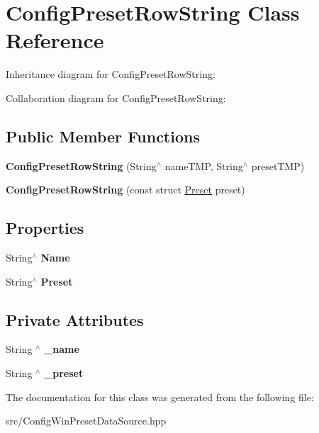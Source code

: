 \hypertarget{classConfigPresetRowString}{}\section{Config\+Preset\+Row\+String Class Reference}
\label{classConfigPresetRowString}


Inheritance diagram for Config\+Preset\+Row\+String\+:


Collaboration diagram for Config\+Preset\+Row\+String\+:
\subsection*{Public Member Functions}
\begin{DoxyCompactItemize}
\item 
\mbox{\label{classConfigPresetRowString_add22c5c7ad76392e2cc5d3fc0b1c24d1}} 
{\bfseries Config\+Preset\+Row\+String} (String$^\wedge$ name\+T\+MP, String$^\wedge$ preset\+T\+MP)
\item 
\mbox{\label{classConfigPresetRowString_a858a64581702f1dd864eefd6770cfa42}} 
{\bfseries Config\+Preset\+Row\+String} (const struct \hyperlink{structPreset}{Preset} preset)
\end{DoxyCompactItemize}
\subsection*{Properties}
\begin{DoxyCompactItemize}
\item 
\mbox{\label{classConfigPresetRowString_ada8ab787d71c023a543797d154183b03}} 
String$^\wedge$ {\bfseries Name}
\item 
\mbox{\label{classConfigPresetRowString_af8e2150c55c5f9504f786ee1479d5103}} 
String$^\wedge$ {\bfseries Preset}
\end{DoxyCompactItemize}
\subsection*{Private Attributes}
\begin{DoxyCompactItemize}
\item 
\mbox{\label{classConfigPresetRowString_a63cbe23eb1fbdf910b2582d67b4a3d1c}} 
String $^\wedge$ {\bfseries \+\_\+name}
\item 
\mbox{\label{classConfigPresetRowString_aef61ba89c689b5fb30676ba8f1851cd5}} 
String $^\wedge$ {\bfseries \+\_\+preset}
\end{DoxyCompactItemize}


The documentation for this class was generated from the following file\+:\begin{DoxyCompactItemize}
\item 
src/Config\+Win\+Preset\+Data\+Source.\+hpp\end{DoxyCompactItemize}
